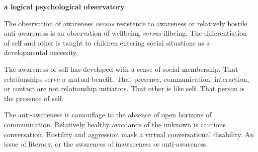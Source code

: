 

{\bf a logical psychological observatory}

\bigskip

The observation of awareness {\it versus} resistence to awareness or
relatively hostile anti-awareness is an observation of wellbeing {\it
versus} illbeing.  The differentiation of self and other is taught to
children entering social situations as a developmental necessity.

The awareness of self has developed with a sense of social membership.
That relationships serve a mutual benefit.  That presence,
communication, interaction, or contact are not relationship
initiators.  That other is like self.  That person is the presence of
self.

The anti-awareness is camouflage to the absence of open horizons of
communication.  Relatively healthy avoidance of the unknown is
cautious conversation.  Hostility and aggression mask a virtual
conversational disability.  An issue of literacy, or the awareness of
inawareness or anti-awareness.  

\bye
